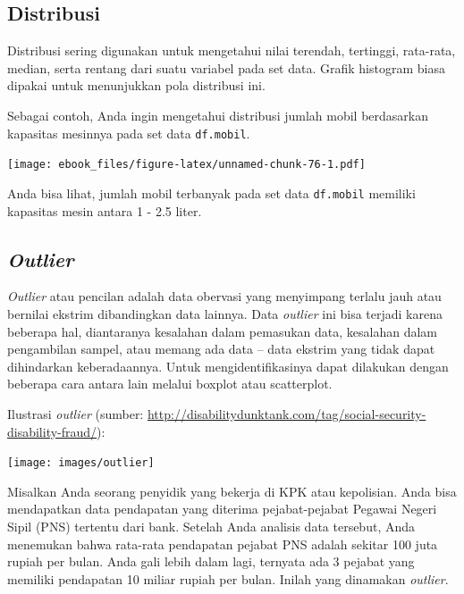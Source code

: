 \documentclass[openany]{book}
\newenvironment{Shaded}{\begin{snugshade}}{\end{snugshade}}
\newcommand{\KeywordTok}[1]{\textcolor[rgb]{0.13,0.29,0.53}{\textbf{#1}}}
\newcommand{\DataTypeTok}[1]{\textcolor[rgb]{0.13,0.29,0.53}{#1}}
\newcommand{\StringTok}[1]{\textcolor[rgb]{0.31,0.60,0.02}{#1}}
\newcommand{\CommentTok}[1]{\textcolor[rgb]{0.56,0.35,0.01}{\textit{#1}}}
\newcommand{\OperatorTok}[1]{\textcolor[rgb]{0.81,0.36,0.00}{\textbf{#1}}}
\newcommand{\NormalTok}[1]{#1}
\begin{document}
\subsection{Distribusi}\label{distribusi}

Distribusi sering digunakan untuk mengetahui nilai terendah, tertinggi,
rata-rata, median, serta rentang dari suatu variabel pada set data.
Grafik histogram biasa dipakai untuk menunjukkan pola distribusi ini.

Sebagai contoh, Anda ingin mengetahui distribusi jumlah mobil
berdasarkan kapasitas mesinnya pada set data \texttt{df.mobil}.

\begin{Shaded}
\end{Shaded}

\texttt{[image: ebook\_files/figure-latex/unnamed-chunk-76-1.pdf]}

Anda bisa lihat, jumlah mobil terbanyak pada set data \texttt{df.mobil}
memiliki kapasitas mesin antara 1 - 2.5 liter.

\subsection{\texorpdfstring{\emph{Outlier}}{Outlier}}\label{outlier}

\emph{Outlier} atau pencilan adalah data obervasi yang menyimpang
terlalu jauh atau bernilai ekstrim dibandingkan data lainnya. Data
\emph{outlier} ini bisa terjadi karena beberapa hal, diantaranya
kesalahan dalam pemasukan data, kesalahan dalam pengambilan sampel, atau
memang ada data -- data ekstrim yang tidak dapat dihindarkan
keberadaannya. Untuk mengidentifikasinya dapat dilakukan dengan beberapa
cara antara lain melalui boxplot atau scatterplot.

Ilustrasi \emph{outlier} (sumber:
\url{http://disabilitydunktank.com/tag/social-security-disability-fraud/}):

\texttt{[image: images/outlier]}

Misalkan Anda seorang penyidik yang bekerja di KPK atau kepolisian. Anda
bisa mendapatkan data pendapatan yang diterima pejabat-pejabat Pegawai
Negeri Sipil (PNS) tertentu dari bank. Setelah Anda analisis data
tersebut, Anda menemukan bahwa rata-rata pendapatan pejabat PNS adalah
sekitar 100 juta rupiah per bulan. Anda gali lebih dalam lagi, ternyata
ada 3 pejabat yang memiliki pendapatan 10 miliar rupiah per bulan.
Inilah yang dinamakan \emph{outlier}.
\end{document}
